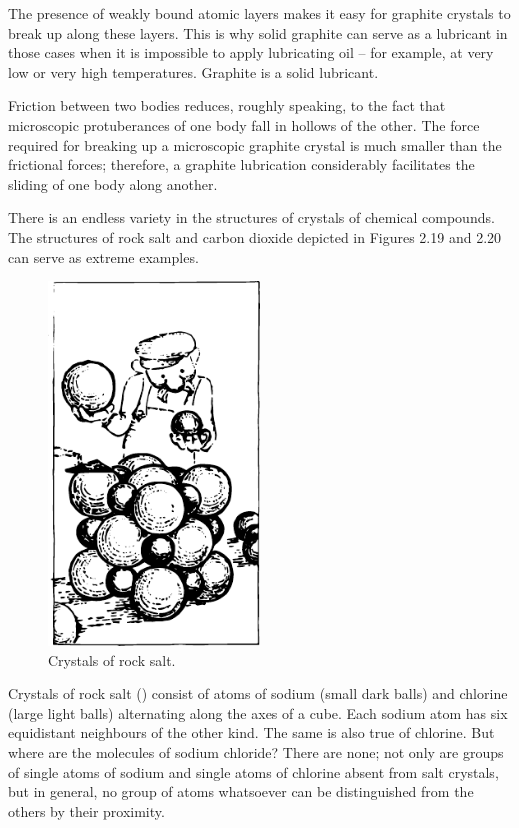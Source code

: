 The presence of weakly bound atomic layers makes it easy for graphite crystals to break up along these layers. This is why solid graphite can serve as a lubricant in those cases when it is impossible to apply lubricating oil -- for example, at very low or very high temperatures. Graphite is a solid lubricant.

Friction between two bodies reduces, roughly speaking, to the fact that microscopic protuberances of one body fall in hollows of the other. The force required for breaking up a microscopic graphite crystal is much smaller than the frictional forces; therefore, a graphite lubrication considerably facilitates the sliding of one body along another.

There is an endless variety in the structures of crystals of chemical compounds. The structures of rock salt and carbon dioxide depicted in Figures 2.19 and 2.20 can serve as extreme examples.

\begin{figure}[!ht]
\centering
\includegraphics[width=0.5\textwidth]{figures/fig-02-19.pdf}
\caption{Crystals of rock salt.}
\label{fig-2.19}
\end{figure}

Crystals of rock salt () consist of atoms of sodium (small dark balls) and chlorine (large light balls) alternating along the axes of a cube. Each sodium atom has six equidistant neighbours of the other kind. The same is also true of chlorine. But where are the molecules of sodium chloride? There are none; not only are groups of single atoms of sodium and single atoms of chlorine absent from salt crystals, but in general, no group of atoms whatsoever can be distinguished from the others by their proximity.

